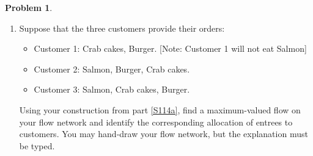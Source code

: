 \documentclass[11pt]{article}
\theoremstyle{definition}
\theoremstyle{definition}
\newtheorem{required}{Problem}
\theoremstyle{definition}
\begin{document}
\begin{required}
\begin{enumerate}[label=(\alph*)]
\begin{proof}[Answer] $ $ \\ 
\begin{enumerate}
    \item Start with a source vertex: $E$ which represents the total number of entrees.
    \item $E$ branches into each specific entree. In this example, there are three new vertices $E_b, E_c$, and $E_s$
    \item The capacities of edges leaving $E$ correspond to how much of each entree the restaurant has in stock. $c(E,E_b)=2$, $c(E,E_c)=3$, and $c(E,E_s)=1$
    \item Next there is a vertex corresponding to each customer: $C_1,C_2 ... C_n$
    \item There is an edge connecting a specific entree to a customer only if the customer has indicated they will eat it. Each edge will only have a capacity of 1 since a customer cannot have more than 1 of an entree.
    \item Finally, all of the customer vertices flow into a single vertex, $C$ that represents the total number of customers. The flow from each customer to $C$ is also 1. 
\end{enumerate}
\end{proof}


\newpage 
\subsubsection{Problem 6\ref{S114b}}
\item \label{S114b} Suppose that the three customers provide their orders:
\begin{itemize}
\item Customer 1: Crab cakes, Burger. [Note: Customer 1 will not eat Salmon]
\item Customer 2: Salmon, Burger, Crab cakes.
\item Customer 3: Salmon, Crab cakes, Burger.
\end{itemize}

\noindent Using your construction from part \ref{S114a}, find a maximum-valued flow on your flow network and identify the corresponding allocation of entrees to customers. You may hand-draw your flow network, but the explanation must be typed.


\end{enumerate}
\end{required}
\end{document}
